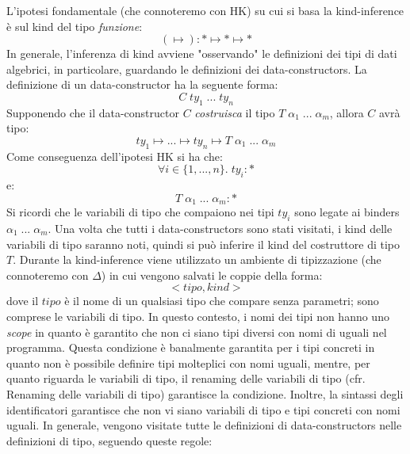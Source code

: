 \documentclass[10pt,a4paper]{article}
\begin{document}
L'ipotesi fondamentale (che connoteremo con HK) su cui si basa la kind-inference è sul kind del tipo \textit{funzione}:
\[ (\mapsto) : * \mapsto * \mapsto * \]
In generale, l'inferenza di kind avviene "osservando" le definizioni dei tipi di dati algebrici, in particolare,
guardando le definizioni dei data-constructors. La definizione di un data-constructor ha la seguente forma:
\[ C \; ty_1 \; ... \; ty_n \]
Supponendo che il data-constructor $ C $ \textit{costruisca} il tipo $ T \; \alpha_1 \; ... \; \alpha_m $, allora
$ C $ avrà tipo:
\[ ty_1 \mapsto ... \mapsto ty_n \mapsto T \; \alpha_1 \; ... \; \alpha_m \]
Come conseguenza dell'ipotesi HK si ha che:
\[ \forall i \in \{ 1, ..., n \}. \; ty_i : * \]
e:
\[ T \; \alpha_1 \; ... \; \alpha_m : * \]
Si ricordi che le variabili di tipo che compaiono nei tipi $ ty_i $ sono legate ai binders
$ \alpha_1 \; ... \; \alpha_m $. Una volta che tutti i data-constructors sono stati visitati, i kind delle variabili di
tipo saranno noti, quindi si può inferire il kind del costruttore di tipo $ T $. Durante la kind-inference viene
utilizzato un ambiente di tipizzazione (che connoteremo con $ \Delta $) in cui vengono salvati le coppie della forma:
\[ < tipo, kind > \]
dove il $ tipo $ è il nome di un qualsiasi tipo che compare senza parametri; sono comprese le variabili di tipo.
In questo contesto, i nomi dei tipi non hanno uno \textit{scope} in quanto è garantito che non ci siano tipi diversi con
nomi di uguali nel programma.
Questa condizione è banalmente garantita per i tipi concreti in quanto non è possibile definire tipi molteplici con nomi
uguali, mentre, per quanto riguarda le variabili di tipo, il renaming
delle variabili di tipo (cfr. Renaming delle variabili di tipo) garantisce la condizione. Inoltre, la sintassi degli
identificatori garantisce che non vi siano variabili di tipo e tipi concreti con nomi uguali.
In generale, vengono visitate tutte le definizioni di data-constructors nelle definizioni di tipo, seguendo queste regole:
\end{document}
